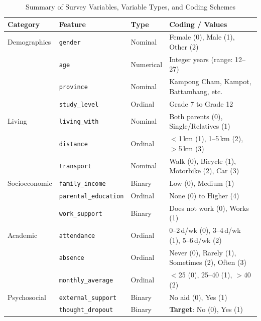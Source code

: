 \begin{table}[!htbp]
    \centering
    \caption{Summary of Survey Variables, Variable Types, and Coding Schemes}
    \label{tab:dataset_summary}
    \small
    \begin{tabular}{llll}
        \toprule
        \textbf{Category} & \textbf{Feature} & \textbf{Type} & \textbf{Coding / Values} \\
        \midrule
        Demographics & \texttt{gender}              & Nominal   & Female (0), Male (1), Other (2) \\
                     & \texttt{age}                 & Numerical & Integer years (range: 12--27) \\
                     & \texttt{province}            & Nominal   & Kampong Cham, Kampot, Battambang, etc. \\
                     & \texttt{study\_level}        & Ordinal   & Grade 7 to Grade 12 \\
        \midrule
        Living       & \texttt{living\_with}        & Nominal   & Both parents (0), Single/Relatives (1) \\
                     & \texttt{distance}            & Ordinal   & $<$1\,km (1), 1--5\,km (2), $>$5\,km (3) \\
                     & \texttt{transport}           & Nominal   & Walk (0), Bicycle (1), Motorbike (2), Car (3) \\
        \midrule
        Socioeconomic & \texttt{family\_income}      & Binary    & Low (0), Medium (1) \\
                      & \texttt{parental\_education} & Ordinal   & None (0) to Higher (4) \\
                      & \texttt{work\_support}       & Binary    & Does not work (0), Works (1) \\
        \midrule
        Academic     & \texttt{attendance}          & Ordinal   & 0--2\,d/wk (0), 3--4\,d/wk (1), 5--6\,d/wk (2) \\
                     & \texttt{absence}             & Ordinal   & Never (0), Rarely (1), Sometimes (2), Often (3) \\
                     & \texttt{monthly\_average}    & Ordinal   & $<$25 (0), 25--40 (1), $>$40 (2) \\
        \midrule
        Psychosocial & \texttt{external\_support}   & Binary    & No aid (0), Yes (1) \\
                     & \texttt{thought\_dropout}    & Binary    & \textbf{Target}: No (0), Yes (1) \\
        \bottomrule
    \end{tabular}
\end{table}



